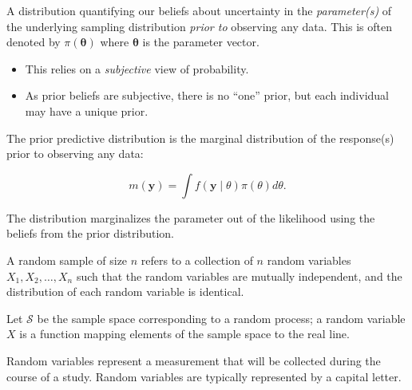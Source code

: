 \documentclass[
  letterpaper,
  DIV=11,
  numbers=noendperiod]{scrreprt}
\providecommand{\tightlist}{%
  \setlength{\itemsep}{0pt}\setlength{\parskip}{0pt}}\usepackage{longtable,booktabs,array}
\theoremstyle{definition}
\theoremstyle{plain}
\theoremstyle{definition}
\theoremstyle{remark}
\begin{document}
\begin{description}
\tightlist
\item[Prior Distribution (Definition~\ref{def-prior-distribution})]
A distribution quantifying our beliefs about uncertainty in the
\emph{parameter(s)} of the underlying sampling distribution \emph{prior
to} observing any data. This is often denoted by
\(\pi(\boldsymbol{\theta})\) where \(\boldsymbol{\theta}\) is the
parameter vector.
\end{description}

\begin{itemize}
\tightlist
\item
  This relies on a \emph{subjective} view of probability.
\item
  As prior beliefs are subjective, there is no ``one'' prior, but each
  individual may have a unique prior.
\end{itemize}

\begin{description}
\tightlist
\item[Prior Predictive Distribution
(Definition~\ref{def-prior-predictive-distribution})]
The prior predictive distribution is the marginal distribution of the
response(s) prior to observing any data:
\end{description}

\[m(\mathbf{y}) = \int f(\mathbf{y} \mid \theta) \pi(\theta) d\theta.\]

The distribution marginalizes the parameter out of the likelihood using
the beliefs from the prior distribution.

\begin{description}
\tightlist
\item[Random Sample (Definition~\ref{def-random-sample})]
A random sample of size \(n\) refers to a collection of \(n\) random
variables \(X_1, X_2, \dotsc, X_n\) such that the random variables are
mutually independent, and the distribution of each random variable is
identical.
\item[Random Variable (Definition~\ref{def-random-variable})]
Let \(\mathcal{S}\) be the sample space corresponding to a random
process; a random variable \(X\) is a function mapping elements of the
sample space to the real line.
\end{description}

Random variables represent a measurement that will be collected during
the course of a study. Random variables are typically represented by a
capital letter.
\end{document}
